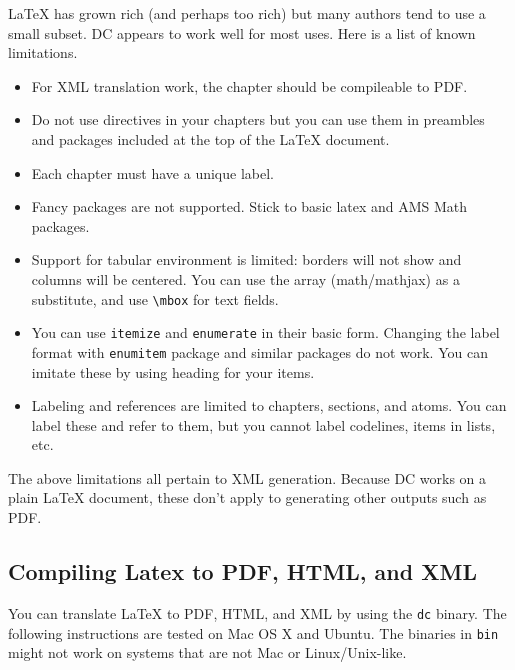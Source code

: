 LaTeX has grown rich (and perhaps too rich) but many authors tend to use a small subset.  
%
DC appears to work well for most uses. 
%
Here is a list of known limitations.  
\begin{itemize}

\item For XML translation work, the chapter should be compileable to PDF.

\item Do not use \lstinline`` directives in your chapters but you can use them in preambles and packages included at the top of the LaTeX document.

\item Each chapter must have a unique label.

\item Fancy packages are not supported.  Stick to basic latex and AMS Math packages.

\item Support for tabular environment is limited: borders will not show and columns will be centered.  You can use the array (math/mathjax) as a substitute, and  use \lstinline`\mbox` for text fields.  
 
\item You can use \lstinline`itemize` and \lstinline`enumerate` in their basic form.  Changing the label format with \lstinline`enumitem` package and similar packages do not work.  You can imitate these by using heading for your items.  

\item Labeling and references are limited to chapters, sections, and atoms.  You can label these and refer to them, but you cannot label codelines, items in lists, etc.

\end{itemize}

\begin{remark}
The above limitations all pertain to XML generation.  Because DC works on a plain LaTeX document, these don't apply to generating other outputs such as 
PDF.
\end{remark}  

\subsection{Compiling Latex to PDF, HTML, and XML}

You can translate LaTeX to PDF, HTML, and XML by using the \lstinline`dc` binary.
%
The following instructions are tested on Mac OS X and Ubuntu.  The binaries in \lstinline`bin` might not work on systems that are not Mac or Linux/Unix-like. 


